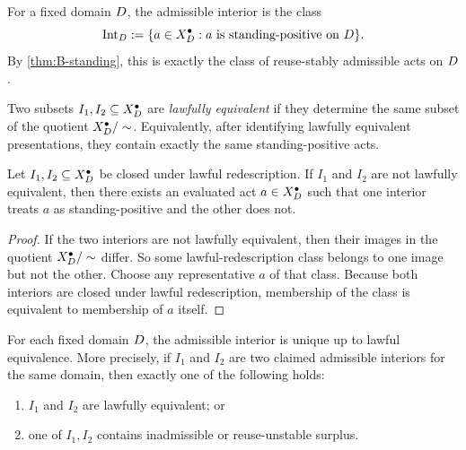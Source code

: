 \begin{definition}
For a fixed domain $D$, the admissible interior is the class
\[
\mathrm{Int}_D:=\{a\in X_D^{\bullet} : a \text{ is standing-positive on } D\}.
\]
By \cref{thm:B-standing}, this is exactly the class of reuse-stably admissible acts on $D$.
\end{definition}

\begin{definition}
Two subsets $I_1,I_2\subseteq X_D^{\bullet}$ are \emph{lawfully equivalent} if they determine the same subset of the quotient $X_D^{\bullet}/\sim$. Equivalently, after identifying lawfully equivalent presentations, they contain exactly the same standing-positive acts.
\end{definition}

\begin{lemma}
\label{lem:B-interior-split}
Let $I_1,I_2\subseteq X_D^{\bullet}$ be closed under lawful redescription. If $I_1$ and $I_2$ are not lawfully equivalent, then there exists an evaluated act $a\in X_D^{\bullet}$ such that one interior treats $a$ as standing-positive and the other does not.
\end{lemma}

\begin{proof}
If the two interiors are not lawfully equivalent, then their images in the quotient $X_D^{\bullet}/\sim$ differ. So some lawful-redescription class belongs to one image but not the other. Choose any representative $a$ of that class. Because both interiors are closed under lawful redescription, membership of the class is equivalent to membership of $a$ itself.
\end{proof}

\begin{theorem}
\label{thm:B-interior-unique}
For each fixed domain $D$, the admissible interior is unique up to lawful equivalence. More precisely, if $I_1$ and $I_2$ are two claimed admissible interiors for the same domain, then exactly one of the following holds:
\begin{enumerate}[label=(\alph*), leftmargin=2.5em]
    \item $I_1$ and $I_2$ are lawfully equivalent; or
    \item one of $I_1,I_2$ contains inadmissible or reuse-unstable surplus.
\end{enumerate}
\end{theorem}

